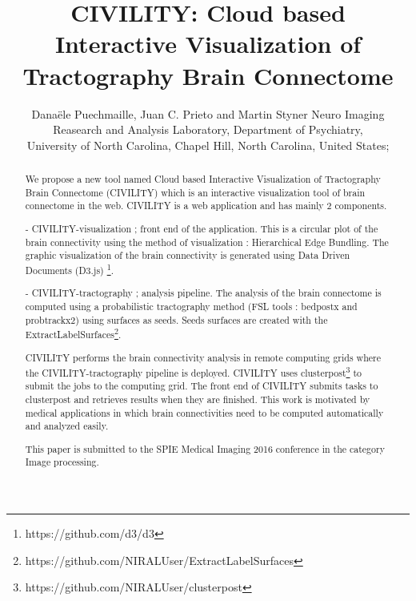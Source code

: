\documentclass[]{spie}  %
\title{CIVILITY: Cloud based Interactive Visualization of Tractography Brain Connectome}
\author{Dana\"{e}le Puechmaille\supit{a}, Juan C. Prieto\supit{a} and Martin Styner\supit{a}
\skiplinehalf
\supit{a}Neuro Imaging Reasearch and Analysis Laboratory, Department of Psychiatry, \\
 University of North Carolina, Chapel Hill, North Carolina, United States;
}
\begin{document}
 
  \maketitle 

\begin{abstract}

We propose a new tool named Cloud based Interactive Visualization of Tractography Brain Connectome (CIVILITY) which is an interactive visualization tool of brain connectome in the web.
CIVILITY is a web application and has mainly 2 components.

- CIVILITY-visualization ; front end of the application. This is a circular plot of the brain connectivity using the method of visualization : Hierarchical Edge Bundling. The graphic visualization of the brain connectivity is generated using Data Driven Documents (D3.js) \footnote{https://github.com/d3/d3}.

- CIVILITY-tractography ; analysis pipeline. The analysis of the brain connectome is computed using a probabilistic tractography method (FSL tools : bedpostx and probtrackx2) using surfaces as seeds. Seeds surfaces are created with the ExtractLabelSurfaces\footnote{https://github.com/NIRALUser/ExtractLabelSurfaces}.

CIVILITY performs the brain connectivity analysis in remote computing grids where the CIVILITY-tractography pipeline is deployed. CIVILITY uses clusterpost\footnote{https://github.com/NIRALUser/clusterpost} to submit the jobs to the computing grid. 
The front end of CIVILITY submits tasks to clusterpost and retrieves results when they are finished.
This work is motivated by medical applications in which brain connectivities need to be computed automatically and analyzed easily.

This paper is submitted to the SPIE Medical Imaging 2016 conference in the category Image processing. 

\end{abstract}



\end{document}
